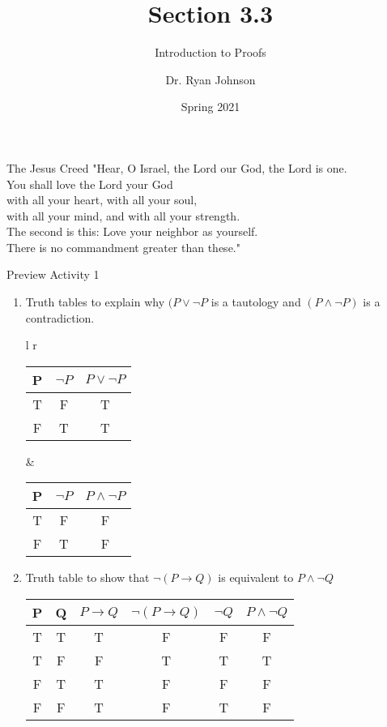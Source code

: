 \documentclass{beamer}
\title{Section 3.3}
\subtitle{Introduction to Proofs}
\author{Dr. Ryan Johnson}
\institute{Grace College}
\date{Spring 2021}
\newcounter{saveenumi}
\newcommand{\seti}{\setcounter{saveenumi}{\value{enumi}}}
\begin{document}
\begin{frame}[plain]
    \maketitle
\end{frame}

\begin{frame}{The Jesus Creed}
\Large{
"Hear, O Israel, the Lord our God, the Lord is one.\\
You shall love the Lord your God\\
\;\; with all your heart, with all your soul,\\
\;\; with all your mind, and with all your strength.\\
The second is this: Love your neighbor as yourself.\\
There is no commandment greater than these."
}
\end{frame}

\begin{frame}{Preview Activity 1}
    \begin{enumerate}
        \item Truth tables to explain why $(P \vee \neg P$ is a tautology and $(P \wedge \neg P)$ is a contradiction. \pause
        
        \begin{tabular}{l r}
             \begin{tabular}{| c | c | c |}
                \hline
                 P & $\neg P$ & $P \vee \neg P$ \\ \hline
                 T & F & T \\ \hline
                 F & T & T \\ \hline
             \end{tabular} &
             \begin{tabular}{| c | c | c |}
                \hline
                 P & $\neg P$ & $P \wedge \neg P$ \\ \hline
                 T & F & F\\ \hline
                 F & T & F \\ \hline
             \end{tabular}
        \end{tabular} \pause
        \item Truth table to show that $\neg ( P \to Q)$ is equivalent to $P \wedge \neg Q$ \pause
        
        \begin{tabular}{| c | c | c | c | c | c |}
            \hline
            P & Q & $P \to Q$ & $\neg(P \to Q)$ & $\neg Q$ & $P \wedge \neg Q$ \\ \hline
            T & T & T & F & F & F \\ \hline
            T & F & F & T & T & T \\ \hline
            F & T & T & F & F & F \\ \hline
            F & F & T & F & T & F \\ \hline
        \end{tabular}
        \seti
    \end{enumerate}
\end{frame}
\end{document}
